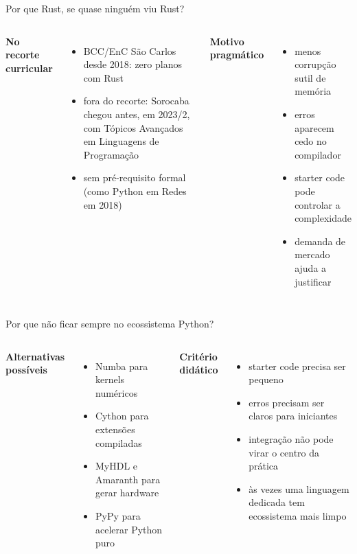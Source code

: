 \documentclass[aspectratio=169,11pt]{beamer}
\newcommand{\eyebrow}[1]{{\color{caipyraOrange}\small\bfseries #1}\par\vspace{0.25em}}
\newenvironment{tightitemize}{%
  \begin{itemize}\setlength{\itemsep}{0.25em}\setlength{\parskip}{0pt}
}{\end{itemize}}
\begin{document}
\begin{frame}{Por que Rust, se quase ninguém viu Rust?}
  \begin{columns}[T,onlytextwidth]
    \eyebrow{No recorte curricular}
    \begin{tightitemize}
      \item BCC/EnC São Carlos desde 2018: zero planos com Rust
      \item fora do recorte: Sorocaba chegou antes, em 2023/2,
        com Tópicos Avançados em Linguagens de Programação
      \item sem pré-requisito formal (como Python em Redes em 2018)
    \end{tightitemize}

    \eyebrow{Motivo pragmático}
    \begin{tightitemize}
      \item menos corrupção sutil de memória
      \item erros aparecem cedo no compilador
      \item starter code pode controlar a complexidade
      \item demanda de mercado ajuda a justificar
    \end{tightitemize}
  \end{columns}
\end{frame}

\begin{frame}{Por que não ficar sempre no ecossistema Python?}
  \begin{columns}[T,onlytextwidth]
    \eyebrow{Alternativas possíveis}
    \begin{tightitemize}
      \item Numba para kernels numéricos
      \item Cython para extensões compiladas
      \item MyHDL e Amaranth para gerar hardware
      \item PyPy para acelerar Python puro
    \end{tightitemize}

    \eyebrow{Critério didático}
    \begin{tightitemize}
      \item starter code precisa ser pequeno
      \item erros precisam ser claros para iniciantes
      \item integração não pode virar o centro da prática
      \item às vezes uma linguagem dedicada tem ecossistema mais limpo
    \end{tightitemize}
  \end{columns}
\end{frame}
\end{document}
